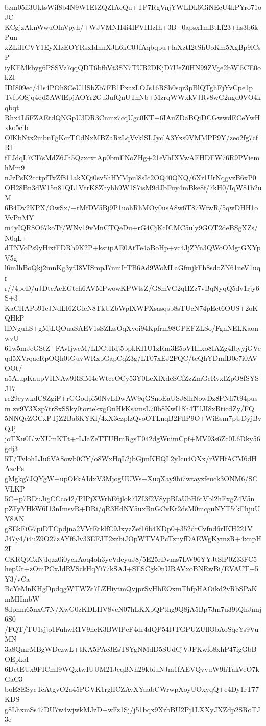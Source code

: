bzm05ii3UktsWif8b4N9W1EtZQZIAcQu+TP7RgVnjYWLDk6GiNEcU4kPYro71oJC
KCgjzAknWwuOlnVpyh/+WJVMNH4i4IFVIHzIh+3B+0apsx1mBtLf23+hs3b6kPun
xZLiHCVY1EyXIzEOYRsxIdnnXJL6kC0JfAqbqpu+laXztI2tShUoKm5XgBp9lCsP
iyKEMkbyg6PSSVz7qqQDT6bfhVt3SN7TUB2DKjD7UeZ0HN99ZVge2bWl5CE0okZl
IDI809ec/41s4POh8CeU1lSbZb7FB1PxazLOJs16RSh0sqr3pBlQTghFjYvCpe1p
TvfpOSjq4qd5AWlEpjAOYr2Gu3ufQnUTnNb+MzrqWWxkVJRv8wG2ngd0VO4kqbqt
Rhx4L5FZAEtdQNGpU3DR3Cnmz7cqUgc0KT+6IAuZDaBQiDCGwwdECeYwHxko5cib
OlKbNtx2mbuFgKcrTCdNxMBZaRzLqVvklSLJyclA3Yxs9VMMPP9Y/zeo2fg7cfRT
fFJdqL7CI7sMdZ6Jh5QzxcxtAp0bmFNoZHg+21eVhIXVwAFHDFW76R9PViemhMm9
nJzPsK2cctpfTxZf811akXQi0sv5hHYMpul8sIc2OQ40QNQ/6Xr1UrNqgvzB6xP0
OH28Bn3dW15n81QL1VtrK8Zhyhh9W1S7isM9dJbFuy4mBke8f/7kH0/IqW81b2uM
6B4Dv2KPX/OwSx/+rMfDV5Bj9P1uohRhMOy0usA8w6T87WfwR/5qwDHH1oVvPnMY
m4yIQR8O67koTf/WNv19vMnCTQeDu+rG4CjKcICMC5uly9GOT2deBSgXZs/N0qL+
dTNVoPs9yHixfFDRh9K2P+kstipAE0AtTe4aBoHp+vc4JjZYn3QWoOMgtGXYpV5g
l6mIhBoQkj2mnKg3yfJ8VISmpJ7nmIrTB6Ad9WoMLaGfmjkFh8sdoZN61ueV1uqr
r//4peD/uJDtcAcEGtch6AVMPwowKPWtsZ/G8mVG2qHZz7vBqNyqQ5dv1rjy6S+3
KaCHAPo91cJNdLI6ZGlcN8TkUZbWplXWFXsasqsb8sTUcN74pEet6OUS+2oKQHkP
lDNguhS+gMjLQOuaSAEV1sSZIzsOqXvoi94Kpfrm98GPEFZLSo/FgnNELKaonwvU
61w5mJeGStZ+FAvIjwcM/LDCtHdj5bpkKI1U1zRm3E5oVHllxo8IAZg4IbyyjGVe
qd5XVrqaeRpOQh0tGuvWRxpGapCqZ3g/LT07xEJ2FQC/teQhYDmfD0e7i0AVOOt/
a5AlupKaupVHNAw9RSiM4cWtceOCy53Y0LeXlXdeSCfZzZmGcRvxIZpO8fSYSJ17
rc29eywkdC8ZgiF+rGGodpi50NvLDwAW9qGSnoEaUSJ8lhNowDz8PNfi7t94pusm
zv9Y3Xzp7trSxSSky0iortekxgOnHkKsamsL70b8KwI18h4TllJI8xBticdZy/FQ
5NNQeZGCxPTjZ2Ba6KYKl/4xX3ezplzQvoOTLnqB2PflP9O+WiEsm7pUDyjBvQJj
joTXu0LlwXUmKTt+rLJaZeTTUHmRgsT042dgWuimCpf+MV93s6Zc0L6Dky56gdj3
5T/TvlohLJu6VA8owb0CY/o8WxHqL2jbGjmKHQL2yIcu4OXx/rWHfACM6dHAzcPs
gMgkg7JQYgW+upOkkAIdxV3MjogUUWs+XuqXay9bi7wtayzfeuck3ONM6/SCVLKP
5C+p7BDuJigCCco42/PIPjXWrbE6jlok7IZI3f2V8ypBIaUbH6tVbl2hFxgZ4V5n
pZFyYHkW6I13nImsvR+DRi/qR3HdNY5uxBnGCvKr2dsM0mcguNYT5ikFhjuUY8AN
gSEkFiG7piDTCpdjna2VVrEtklfC9JxyzZef16b4KDp0+352drCvfnd6rIKH221V
J47y4/i4uZ9O27zAYf6Jv33EFJT2zzbiJOpWTVAPcTznyfDAEWgKymzR+4xnpH2L
CKRQtCxNjIqzz0i0yckAoq4oh3ycVdcyuJ8/5E25rDvms7LW96YYJtSlP0Z33FC5
hepUr+zOmPCxJdRVSckHqYi77kSAJ+SESCgk0nURAVxoBNRwBi/EVAUT+5Y3/vCa
BcYeMnKHgDpdqgWTWZt7LZHiytmQvjprSvHbEOxmThfpHAOikd2vRbSPaKmMHmbW
8dpnm65nxC7N/XwG0zKDLHV8vcN07hLKXpQPthg9Q8jA5Bp73m7u39tQhJnnj6S0
/FQT/TU1sjjo1FuhwR1V9heK3BWlPcF4dr4dQP54lJTGPUZUllObAoSqcYs9VuMN
3a8QmrMBgWDczwL+tKA5PAc3EsT8YgNMdD5SUdCjVJFKwfo8xhP47igGbBOEpkoI
6DetEUx9PICmI9WQxtwIUUM21JcqBNh29kbiuNJm1fAEVQvvuW9hTakVeO7kGaC3
boE8ESycTcAtgvO2a45PGVK1rglICZAvXYaabCWrwpXoyUOxyqQ+e4Dy1rT77KDS
g8LhxmSs47DU7w4wjwkMJzD+wFz1Sj/j51bqx9XrbBU2Pj1LXXyJXZdp2SRoTJ3e
